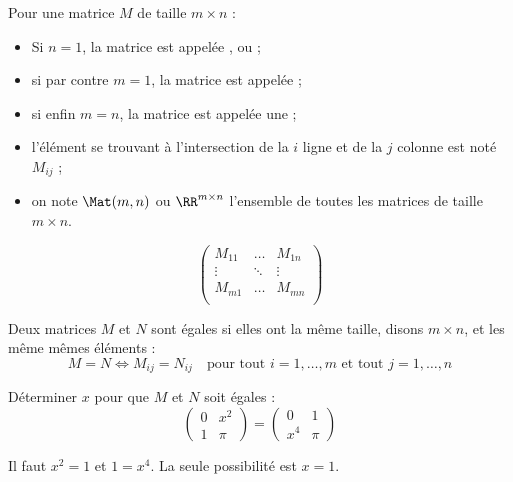 \begin{frame}
  \begin{definition}Pour une matrice \(M\) de taille \(m\times n\) :
    \begin{itemize}[<+->]
    \item Si \(n = 1\), la matrice est appelée , ou  ;
    \item si par contre \(m = 1\), la matrice est appelée  ;
    \item si enfin \(m = n\), la matrice est appelée une  ;
    \item l'élément se trouvant à l'intersection de la \(i\)\ieme{} ligne et de la \(j\)\ieme{} colonne est noté \(M_{ij}\) ;
    \item on note \(\Mat(m,n)\) ou \(\RR^{m\times n}\) l'ensemble de toutes les matrices de taille \(m \times n\).
    \end{itemize}
  \end{definition}
  \begin{example}\pause{}
    \begin{equation*}
      \begin{pmatrix}
        M_{11} &\ldots& M_{1n}\\
        \vdots& \ddots&\vdots \\
        M_{m1} &\ldots& M_{mn}\\
      \end{pmatrix}
    \end{equation*}
  \end{example}
\end{frame}
\begin{frame}
  \begin{definition}
    Deux matrices \(M\) et \(N\) sont égales si elles ont la même taille, disons \(m\times n\), et les même mêmes éléments :\pause{}
    \begin{equation*}
      M = N \iff M_{ij} = N_{ij} \quad\text{pour tout \(i = 1, \ldots, m\) et tout \(j = 1, \ldots, n\)}
    \end{equation*}
  \end{definition}\pause{}
  \begin{exercise}
    Déterminer \(x\) pour que \(M\) et \(N\) soit égales :
    \begin{equation*}
      \begin{pmatrix}
        0 & x^{2} \\
        1 & \pi
      \end{pmatrix}
      =
      \begin{pmatrix}
        0 & 1\\
        x^{4} & \pi
      \end{pmatrix}
    \end{equation*}
  \end{exercise}
  \begin{answer}\pause{}
    Il faut \(x^{2} = 1\) et \(1 = x^{4}\).\pause{} La seule possibilité est \(x = 1\).
  \end{answer}
\end{frame}

